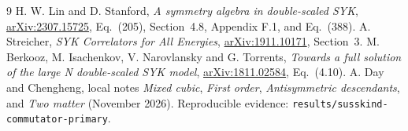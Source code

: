 \documentclass[11pt,a4paper]{article}
\begin{document}
\begin{thebibliography}{9}
 H. W. Lin and D. Stanford, \emph{A symmetry algebra in
double-scaled SYK}, \href{https://arxiv.org/abs/2307.15725}{arXiv:2307.15725},
Eq.~(205), Section~4.8, Appendix F.1, and Eq.~(388).
 A. Streicher, \emph{SYK Correlators for All Energies},
\href{https://arxiv.org/abs/1911.10171}{arXiv:1911.10171}, Section~3.
 M. Berkooz, M. Isachenkov, V. Narovlansky and G. Torrents,
\emph{Towards a full solution of the large N double-scaled SYK model},
\href{https://arxiv.org/abs/1811.02584}{arXiv:1811.02584}, Eq.~(4.10).
 A. Day and Chengheng, local notes \emph{Mixed cubic},
\emph{First order}, \emph{Antisymmetric descendants}, and
\emph{Two matter} (November 2026). Reproducible evidence:
\texttt{results/susskind-commutator-primary}.
\end{thebibliography}
\end{document}
